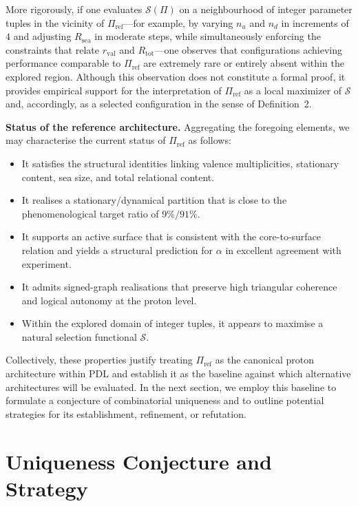 \documentclass[11pt,a4paper]{article}
\begin{document}
More rigorously, if one evaluates $\mathcal{S}(\Pi)$ on a neighbourhood of integer parameter tuples in the vicinity of $\Pi_{\mathrm{ref}}$—for example, by varying $n_u$ and $n_d$ in increments of $4$ and adjusting $R_{\mathrm{sea}}$ in moderate steps, while simultaneously enforcing the constraints that relate $r_{\mathrm{val}}$ and $R_{\mathrm{tot}}$—one observes that configurations achieving performance comparable to $\Pi_{\mathrm{ref}}$ are extremely rare or entirely absent within the explored region.\cite{LaubscherPDLFull2026,LaubscherIMRadPDL2026} Although this observation does not constitute a formal proof, it provides empirical support for the interpretation of $\Pi_{\mathrm{ref}}$ as a local maximizer of $\mathcal{S}$ and, accordingly, as a selected configuration in the sense of Definition~2.

\medskip
\noindent\textbf{Status of the reference architecture.} Aggregating the foregoing elements, we may characterise the current status of $\Pi_{\mathrm{ref}}$ as follows:
\begin{itemize}
\item It satisfies the structural identities linking valence multiplicities, stationary content, sea size, and total relational content.
\item It realises a stationary/dynamical partition that is close to the phenomenological target ratio of $9\%/91\%$.
\item It supports an active surface that is consistent with the core-to-surface relation and yields a structural prediction for $\alpha$ in excellent agreement with experiment.
\item It admits signed-graph realisations that preserve high triangular coherence and logical autonomy at the proton level.
\item Within the explored domain of integer tuples, it appears to maximise a natural selection functional $\mathcal{S}$.
\end{itemize}
Collectively, these properties justify treating $\Pi_{\mathrm{ref}}$ as the canonical proton architecture within PDL and establish it as the baseline against which alternative architectures will be evaluated. In the next section, we employ this baseline to formulate a conjecture of combinatorial uniqueness and to outline potential strategies for its establishment, refinement, or refutation.

\section{Uniqueness Conjecture and Strategy}
\label{sec:conjecture}
\end{document}
